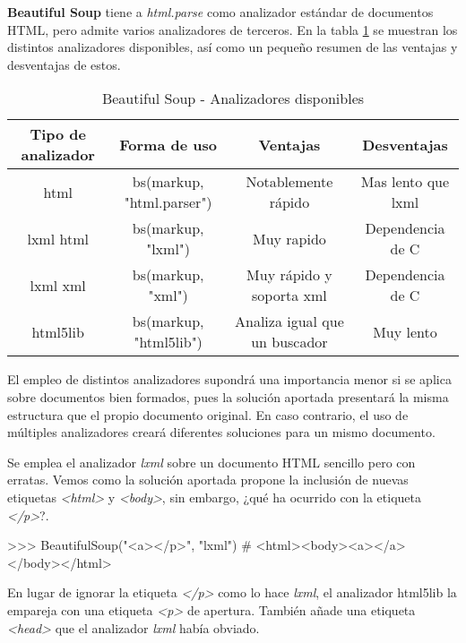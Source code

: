 \textbf{Beautiful Soup} tiene a \emph{html.parse} como analizador estándar de documentos HTML, pero admite 
varios analizadores de terceros. En la tabla \ref{tab:beautiful soup - analizadores disponibles} se muestran 
los distintos analizadores disponibles, así como un pequeño resumen de las ventajas y desventajas de estos.

\begin{table}[h]
  \begin{center}
  \begin{tabular}{| c | c | c | c |}
  \hline \textbf{Tipo de analizador} & \textbf{Forma de uso} & \textbf{Ventajas} & \textbf{Desventajas} \\ \hline
  html & bs(markup, "html.parser") & Notablemente rápido & Mas lento que lxml \\
  lxml html & bs(markup, "lxml") & Muy rapido & Dependencia de C \\
  lxml xml & bs(markup, "xml") & Muy rápido y soporta xml & Dependencia de C \\
  html5lib & bs(markup, "html5lib") & Analiza igual que un buscador & Muy lento \\ \hline
  \end{tabular}
  \caption{Beautiful Soup - Analizadores disponibles}
  \label{tab:beautiful soup - analizadores disponibles}
  \end{center}
\end{table}

El empleo de distintos analizadores supondrá una importancia menor si se aplica sobre documentos bien
formados, pues la solución aportada presentará la misma estructura que el propio documento original. En
caso contrario, el uso de múltiples analizadores creará diferentes soluciones para un mismo documento.

Se emplea el analizador \emph{lxml} sobre un documento HTML sencillo pero con erratas. Vemos como la solución 
aportada propone la inclusión de nuevas etiquetas \emph{<html>} y \emph{<body>}, sin embargo, ¿qué ha 
ocurrido con la etiqueta \emph{</p>}?.

\begin{Schunk}
  \begin{Soutput}
    >>> BeautifulSoup("<a></p>", "lxml")
    # <html><body><a></a></body></html>
  \end{Soutput}
\end{Schunk}

En lugar de ignorar la etiqueta \emph{</p>} como lo hace \emph{lxml}, el analizador html5lib la empareja 
con una etiqueta \emph{<p>} de apertura. También añade una etiqueta \emph{<head>} que el analizador 
\emph{lxml} había obviado.

